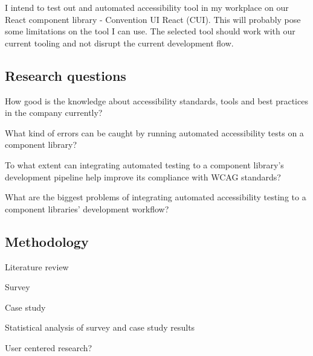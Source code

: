 \documentclass{master_thesis}
\begin{document}
I intend to test out and automated accessibility tool in my workplace on our React component library - Convention UI React (CUI). This will probably pose some limitations on the tool I can use. The selected tool should work with our current tooling and not disrupt the current development flow.

\subsection{Research questions}

	\begin{RQlist}
		\item How good is the knowledge about accessibility standards, tools and best practices in the company currently?
		\item What kind of errors can be caught by running automated accessibility tests on a component library?
		\item To what extent can integrating automated testing to a component library's development pipeline help improve its compliance with WCAG standards?
		\item What are the biggest problems of integrating automated accessibility testing to a component libraries' development workflow?
	\end{RQlist}

\subsection{Methodology}


\begin{list}{-}{}
	\item Literature review
	\item Survey
	\item Case study
	\item Statistical analysis of survey and case study results
	\item User centered research?
\end{list}

\end{document}
